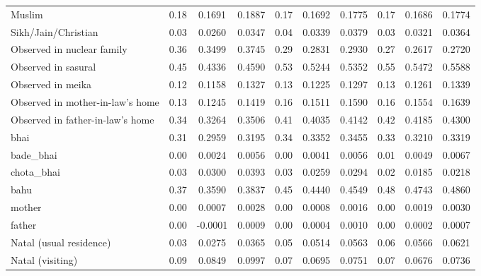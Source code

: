 {\begin{tabular}{l*{3}{ccc}}
Muslim              &        0.18&      0.1691&      0.1887&        0.17&      0.1692&      0.1775&        0.17&      0.1686&      0.1774\\
Sikh/Jain/Christian &        0.03&      0.0260&      0.0347&        0.04&      0.0339&      0.0379&        0.03&      0.0321&      0.0364\\
Observed in nuclear family&        0.36&      0.3499&      0.3745&        0.29&      0.2831&      0.2930&        0.27&      0.2617&      0.2720\\
Observed in sasural &        0.45&      0.4336&      0.4590&        0.53&      0.5244&      0.5352&        0.55&      0.5472&      0.5588\\
Observed in meika   &        0.12&      0.1158&      0.1327&        0.13&      0.1225&      0.1297&        0.13&      0.1261&      0.1339\\
Observed in mother-in-law's home&        0.13&      0.1245&      0.1419&        0.16&      0.1511&      0.1590&        0.16&      0.1554&      0.1639\\
Observed in father-in-law's home&        0.34&      0.3264&      0.3506&        0.41&      0.4035&      0.4142&        0.42&      0.4185&      0.4300\\
bhai                &        0.31&      0.2959&      0.3195&        0.34&      0.3352&      0.3455&        0.33&      0.3210&      0.3319\\
bade\_bhai           &        0.00&      0.0024&      0.0056&        0.00&      0.0041&      0.0056&        0.01&      0.0049&      0.0067\\
chota\_bhai          &        0.03&      0.0300&      0.0393&        0.03&      0.0259&      0.0294&        0.02&      0.0185&      0.0218\\
bahu                &        0.37&      0.3590&      0.3837&        0.45&      0.4440&      0.4549&        0.48&      0.4743&      0.4860\\
mother              &        0.00&      0.0007&      0.0028&        0.00&      0.0008&      0.0016&        0.00&      0.0019&      0.0030\\
father              &        0.00&     -0.0001&      0.0009&        0.00&      0.0004&      0.0010&        0.00&      0.0002&      0.0007\\
Natal (usual residence)&        0.03&      0.0275&      0.0365&        0.05&      0.0514&      0.0563&        0.06&      0.0566&      0.0621\\
Natal (visiting)    &        0.09&      0.0849&      0.0997&        0.07&      0.0695&      0.0751&        0.07&      0.0676&      0.0736\\

\end{tabular}}
